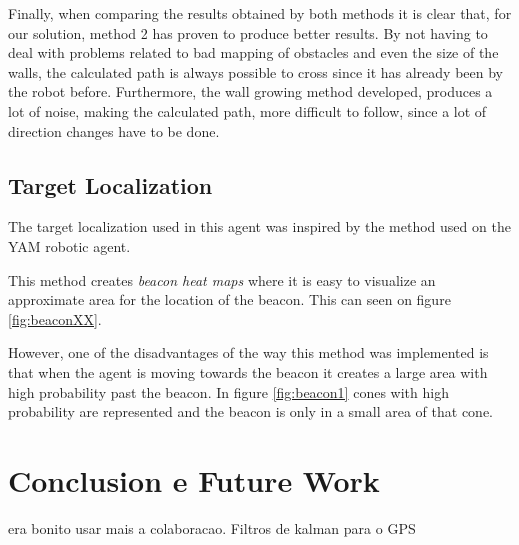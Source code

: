\documentclass[oribibl]{llncs}
\begin{document}
Finally, when comparing the results obtained by both methods it is clear that, for our solution, method 2 has proven to produce better results. By not having to deal with problems related to bad mapping of obstacles and even the size of the walls, the calculated path is always possible to cross since it has already been by the robot before. Furthermore, the wall growing method developed, produces a lot of noise, making the calculated path, more difficult to follow, since a lot of direction changes have to be done.


\subsection{Target Localization}
The target localization used in this agent was inspired by the method used on the
YAM robotic agent.\cite{Ribeiro2002}

This method creates \textit{beacon heat maps} where it is easy to visualize an approximate
area for the location of the beacon. This can seen on figure \ref{fig:beaconXX}.

However, one of the disadvantages of the way this method was implemented is that when the agent
is moving towards the beacon it creates a large area with high probability past the beacon.
In figure \ref{fig:beacon1} cones with high probability are represented and the beacon is only in a small area of that cone.


\section{Conclusion e Future Work}
era bonito usar mais a colaboracao.
Filtros de kalman para o GPS



\end{document}
